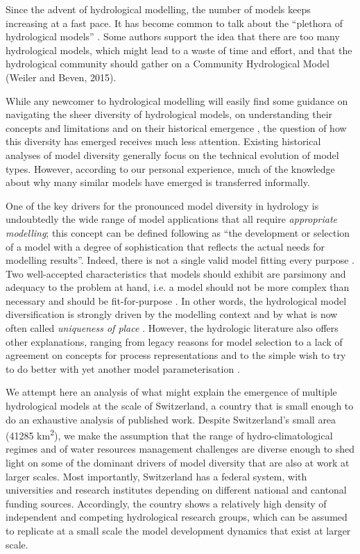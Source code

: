\documentclass[10pt,a4paper]{article}
\begin{document}
Since the advent of hydrological modelling, the number of models keeps increasing at a fast pace. It has become common to talk about the ``plethora of hydrological models'' \citep{Clark2011a}. Some authors support the idea that there are too many hydrological models, which might lead to a waste of time and effort, and that the hydrological community should gather on a Community Hydrological Model (Weiler and Beven, 2015).

While any newcomer to hydrological modelling will easily find some guidance on navigating the sheer diversity of hydrological models, on understanding their concepts and limitations \citep{Beven2013, Solomatine2011, Kauffeldt2016} and on their historical emergence \citep{Beven2020, Beven2020a}, the question of how this diversity has emerged receives much less attention. Existing historical analyses of model diversity \citep{Peel2020} generally focus on the technical evolution of model types. However, according to our personal experience, much of the knowledge about why many similar models have emerged is transferred informally.

One of the key drivers for the pronounced model diversity in hydrology is undoubtedly the wide range of model applications \citep{Weiler2015} that all require \textit{appropriate modelling}; this concept can be defined following \citet{Rosbjerg2005} as ``the development or selection of a model with a degree of sophistication that reflects the actual needs for modelling results''. Indeed, there is not a single valid model fitting every purpose \citep{Hamalainen2015}. Two well-accepted characteristics that models should exhibit are parsimony and adequacy to the problem at hand, i.e. a model should not be more complex than necessary and should be fit-for-purpose \citep{Beven2013}. In other words, the hydrological model diversification is strongly driven by the modelling context and by what is now often called \textit{uniqueness of place} \citep{Beven2000}. However, the hydrologic literature also offers other explanations, ranging from legacy reasons for model selection \citep{Addor2019} to a lack of agreement on concepts for process representations and to the simple wish to try to do better with yet another model parameterisation \citep{Weiler2015}.

We attempt here an analysis of what might explain the emergence of multiple hydrological models at the scale of Switzerland, a country that is small enough to do an exhaustive analysis of published work. Despite Switzerland's small area (41285 km\textsuperscript{2}), we make the assumption that the range of hydro-climatological regimes \citep{Aschwanden1985} and of water resources management challenges \citep{Schneider2013, FOEN2021} are diverse enough to shed light on some of the dominant drivers of model diversity that are also at work at larger scales. Most importantly, Switzerland has a federal system, with universities and research institutes depending on different national and cantonal funding sources. Accordingly, the country shows a relatively high density of independent and competing hydrological research groups, which can be assumed to replicate at a small scale the model development dynamics that exist at larger scale.
\end{document}
